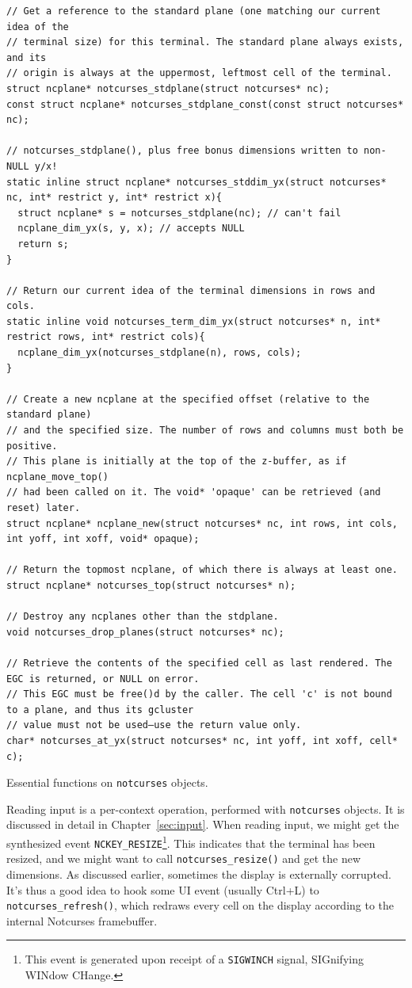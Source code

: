 \documentclass[letterpaper,10pt]{article}
\begin{document}
\begin{listing}[!htb]
\begin{verbatim}
// Get a reference to the standard plane (one matching our current idea of the
// terminal size) for this terminal. The standard plane always exists, and its
// origin is always at the uppermost, leftmost cell of the terminal.
struct ncplane* notcurses_stdplane(struct notcurses* nc);
const struct ncplane* notcurses_stdplane_const(const struct notcurses* nc);

// notcurses_stdplane(), plus free bonus dimensions written to non-NULL y/x!
static inline struct ncplane* notcurses_stddim_yx(struct notcurses* nc, int* restrict y, int* restrict x){
  struct ncplane* s = notcurses_stdplane(nc); // can't fail
  ncplane_dim_yx(s, y, x); // accepts NULL
  return s;
}

// Return our current idea of the terminal dimensions in rows and cols.
static inline void notcurses_term_dim_yx(struct notcurses* n, int* restrict rows, int* restrict cols){
  ncplane_dim_yx(notcurses_stdplane(n), rows, cols);
}

// Create a new ncplane at the specified offset (relative to the standard plane)
// and the specified size. The number of rows and columns must both be positive.
// This plane is initially at the top of the z-buffer, as if ncplane_move_top()
// had been called on it. The void* 'opaque' can be retrieved (and reset) later.
struct ncplane* ncplane_new(struct notcurses* nc, int rows, int cols, int yoff, int xoff, void* opaque);

// Return the topmost ncplane, of which there is always at least one.
struct ncplane* notcurses_top(struct notcurses* n);

// Destroy any ncplanes other than the stdplane.
void notcurses_drop_planes(struct notcurses* nc);

// Retrieve the contents of the specified cell as last rendered. The EGC is returned, or NULL on error.
// This EGC must be free()d by the caller. The cell 'c' is not bound to a plane, and thus its gcluster
// value must not be used—use the return value only.
char* notcurses_at_yx(struct notcurses* nc, int yoff, int xoff, cell* c);
\end{verbatim}
\caption{Essential functions on \texttt{notcurses} objects.}
\end{listing}

Reading input is a per-context operation, performed with \texttt{notcurses}
objects. It is discussed in detail in Chapter~\ref{sec:input}. When reading
input, we might get the synthesized event \texttt{NCKEY\_RESIZE}\footnote{This
event is generated upon receipt of a \texttt{SIGWINCH} signal, SIGnifying WINdow
CHange.}. This indicates that the terminal has been resized, and we might want
to call \texttt{notcurses\_resize()} and get the new dimensions. As discussed
earlier, sometimes the display is externally corrupted. It's thus a good idea
to hook some UI event (usually Ctrl+L) to \texttt{notcurses\_refresh()}, which
redraws every cell on the display according to the internal Notcurses
framebuffer.
\end{document}
